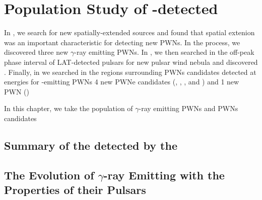 
\chapter{Population Study of -detected }


In , we search for new spatially-extended \fermi
sources and found that spatial extenion was an important characteristic
for detecting new \acp{PWN}. In the process, we discovered three
new $\gamma$-ray emitting \acp{PWN}.  In , we then
searched in the off-peak phase interval of \ac{LAT}-detected pulsars
for new pulsar wind nebula and discovered \threecfiftyeight.  Finally,
in  we searched in the regions surrounding \acp{PWN}
candidates detected at \tev energies for \gev-emitting \acp{PWN}
4 new PWNe candidates (, , ,
and ) and 1 new PWN ()

In this chapter, we take the population of $\gamma$-ray emitting \acp{PWN} and \acp{PWN}
candidates


\section{Summary of the  detected by the }

\section{The Evolution of $\gamma$-ray Emitting  with the Properties of their Pulsars}

